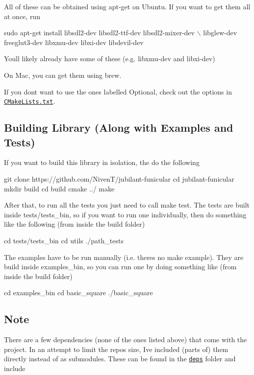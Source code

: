 All of these can be obtained using {\ttfamily apt-\/get} on Ubuntu. If you want to get them all at once, run


\begin{DoxyCode}
sudo apt-get install libsdl2-dev libsdl2-ttf-dev libsdl2-mixer-dev \(\backslash\)
    libglew-dev freeglut3-dev libxmu-dev libxi-dev libdevil-dev
\end{DoxyCode}
 You\textquotesingle{}ll likely already have some of these (e.\+g. libxmu-\/dev and libxi-\/dev)

On Mac, you can get them using {\ttfamily brew}.

If you don\textquotesingle{}t want to use the ones labelled Optional, check out the {\ttfamily option}s in \href{https://github.com/NivenT/jubilant-funicular/blob/master/CMakeLists.txt#L45}{\tt C\+Make\+Lists.\+txt}.

\subsection*{Building Library (Along with Examples and Tests)}

If you want to build this library in isolation, the do the following 
\begin{DoxyCode}
git clone https://github.com/NivenT/jubilant-funicular
cd jubilant-funicular
mkdir build
cd build
cmake ../
make
\end{DoxyCode}


After that, to run all the tests you just need to call {\ttfamily make test}. The tests are built inside {\ttfamily tests/tests\+\_\+bin}, so if you want to run one individually, then do something like the following (from inside the build folder) 
\begin{DoxyCode}
cd tests/tests\_bin
cd utils
./path\_tests
\end{DoxyCode}


The examples have to be run manually (i.\+e. there\textquotesingle{}s no {\ttfamily make example}). They are build inside {\ttfamily examples\+\_\+bin}, so you can run one by doing something like (from inside the build folder) 
\begin{DoxyCode}
cd examples\_bin
cd basic\_square
./basic\_square
\end{DoxyCode}


\subsection*{Note}

There are a few dependencies (none of the ones listed above) that come with the project. In an attempt to limit the repo\textquotesingle{}s size, I\textquotesingle{}ve included (parts of) them directly instead of as submodules. These can be found in the \href{https://github.com/NivenT/jubilant-funicular/tree/master/deps}{\tt deps} folder and include


